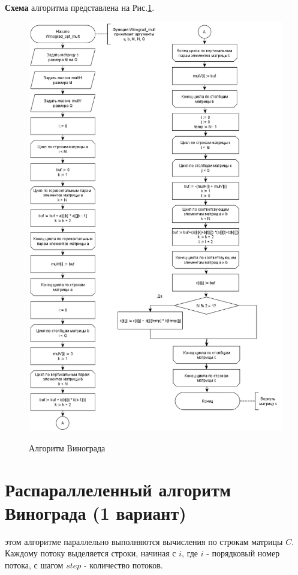 \textbf{Схема} алгоритма представлена на Рис.\ref{fig1:image}.\\
\begin{figure}[pt!]
	\begin{center}
		{\includegraphics[scale = 0.52]{schemes/opt_winograd}}
		\caption{Алгоритм Винограда}
		\label{fig1:image}
	\end{center}
\end{figure}

\newpage

\section{Распараллеленный алгоритм Винограда (1 вариант)}
 этом алгоритме параллельно выполняются вычисления по строкам матрицы $C$. Каждому потоку выделяется строки, начиная с $i$, где $i$ - порядковый номер потока, с шагом $step$ - количество потоков.

